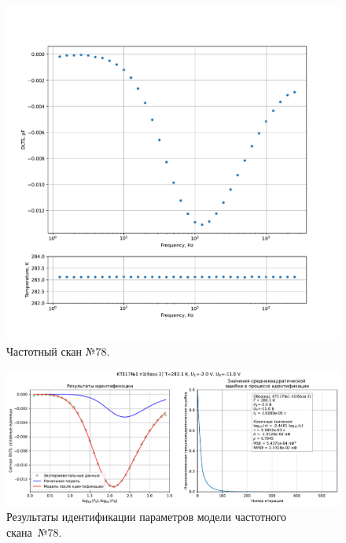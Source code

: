 \begin{figure}[!ht]
    \centering
    \includegraphics[width=1\textwidth]{../plots/КТ117№1_п1(база 2)_2500Гц-1Гц_1пФ_+10С_-2В-11В_200мВ_20мкс_шаг_0,1.pdf}
    \caption{Частотный скан №78.}
    \label{pic:frequency_scan_78}
\end{figure}

\begin{figure}[!ht]
    \centering
    \includegraphics[width=1\textwidth]{../plots/КТ117№1_п1(база 2)_2500Гц-1Гц_1пФ_+10С_-2В-11В_200мВ_20мкс_шаг_0,1_model.pdf}
    \caption{Результаты идентификации параметров модели частотного скана~№78.}
    \label{pic:frequency_scan_model78}
\end{figure}

\pagebreak


